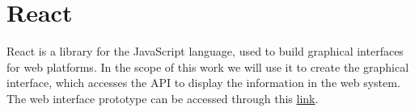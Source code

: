\section{React}
React is a library for the JavaScript language, used to build graphical interfaces for web platforms. In the scope of this work we will use it to create the graphical interface, which accesses the API to display the information in the web system. The web interface prototype can be accessed through this \href{https://www.figma.com/file/NHTBlNSzzWVDL6fHFgLb0Q/Meta-Social-Media?node-id=0%3A1}{link}.